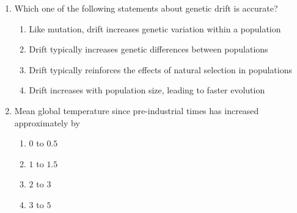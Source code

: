 \documentclass[journal]{IEEEtran}
\begin{document}
\begin{enumerate}
    \item Which one of the following statements about genetic drift is accurate?
\begin{enumerate}
        \item Like mutation, drift increases genetic variation within a population
        \item Drift typically increases genetic differences between populations
        \item Drift typically reinforces the effects of natural selection in populations
        \item Drift increases with population size, leading to faster evolution
    \end{enumerate}
    
    \item Mean global temperature since pre-industrial times has increased approximately by
    \begin{multicols}{2}
    \begin{enumerate}
   
     \item $0$ to $0.5$ \textcelsius
        \item $1$ to $1.5$ \textcelsius
        \item $2$ to $3$ \textcelsius
        \item $3$ to $5$ \textcelsius
    \end{enumerate}
    \end{multicols}
    

\end{enumerate}
\end{document}
